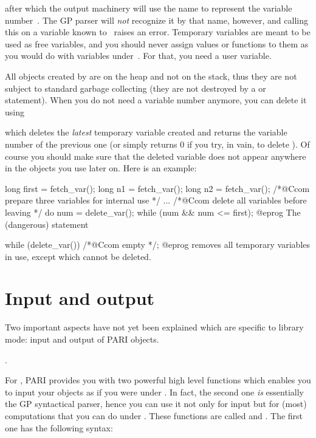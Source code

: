 
\noindent after which the output machinery will use the name  to
represent the variable number~. The GP parser will \emph{not}
recognize it by that name, however, and calling this on a variable known
to~ raises an error. Temporary variables are meant to be used as free
variables, and you should never assign values or functions to them as you
would do with variables under~. For that, you need a user variable.

All objects created by  are on the heap and not on the stack,
thus they are not subject to standard garbage collecting (they are not
destroyed by a  or  statement). When you do
not need a variable number anymore, you can delete it using


\noindent which deletes the \emph{latest} temporary variable created and
returns the variable number of the previous one (or simply returns 0 if you
try, in vain, to delete ). Of course you should make sure that
the deleted variable does not appear anywhere in the objects you use later
on. Here is an example:

\bprog
  long first = fetch_var();
  long n1 = fetch_var();
  long n2 = fetch_var(); /*@Ccom prepare three variables for internal use */
  ...
  /*@Ccom delete all variables before leaving */
  do { num = delete_var(); } while (num && num <= first);
@eprog\noindent
The (dangerous) statement

\bprog
  while (delete_var()) /*@Ccom empty */;
@eprog\noindent
removes all temporary variables in use, except  which cannot be
deleted.

\section{Input and output}

\noindent
Two important aspects have not yet been explained which are specific to
library mode: input and output of PARI objects.

.

\noindent
For , PARI provides you with two powerful high level functions
which enables you to input your objects as if you were under . In fact,
the second one \emph{is} essentially the GP syntactical parser, hence you
can use it not only for input but for (most) computations that you can do
under . These functions are called  and . The
first one has the following syntax:\label{se:freadexpr}


